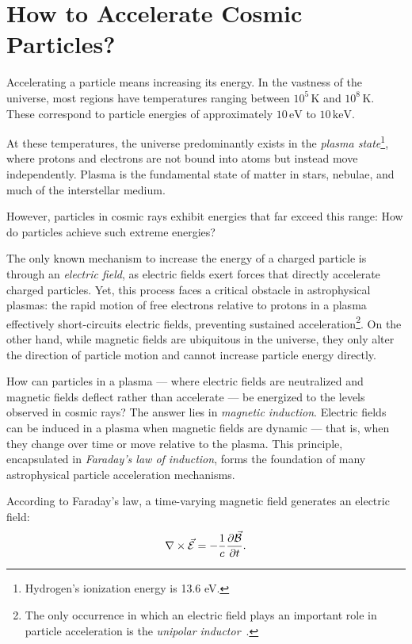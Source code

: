 \section{How to Accelerate Cosmic Particles?}

Accelerating a particle means increasing its energy. In the vastness of the universe, most regions have temperatures ranging between \( 10^5 \, \text{K} \) and \( 10^8 \, \text{K} \). These correspond to particle energies of approximately \( 10 \, \text{eV} \) to \( 10 \, \text{keV} \).

At these temperatures, the universe predominantly exists in the \emph{plasma state}\footnote{Hydrogen's ionization energy is 13.6 eV.}, where protons and electrons are not bound into atoms but instead move independently. Plasma is the fundamental state of matter in stars, nebulae, and much of the interstellar medium.

However, particles in cosmic rays exhibit energies that far exceed this range: How do particles achieve such extreme energies?

The only known mechanism to increase the energy of a charged particle is through an \emph{electric field}, as electric fields exert forces that directly accelerate charged particles. Yet, this process faces a critical obstacle in astrophysical plasmas: the rapid motion of free electrons relative to protons in a plasma effectively short-circuits electric fields, preventing sustained acceleration\footnote{The only occurrence in which an electric field plays an important role in particle acceleration is the \emph{unipolar inductor}~\cite{}.}.
%   
On the other hand, while magnetic fields are ubiquitous in the universe, they only alter the direction of particle motion and cannot increase particle energy directly.

How can particles in a plasma --- where electric fields are neutralized and magnetic fields deflect rather than accelerate --- be energized to the levels observed in cosmic rays? The answer lies in \emph{magnetic induction}. Electric fields can be induced in a plasma when magnetic fields are dynamic --- that is, when they change over time or move relative to the plasma. This principle, encapsulated in \emph{Faraday's law of induction}, forms the foundation of many astrophysical particle acceleration mechanisms.

According to Faraday's law, a time-varying magnetic field generates an electric field:
\[
\vb\nabla \times \vec{\mathcal E} = -\frac{1}{c} \frac{\partial \vec{\mathcal B}}{\partial t}.
\]

